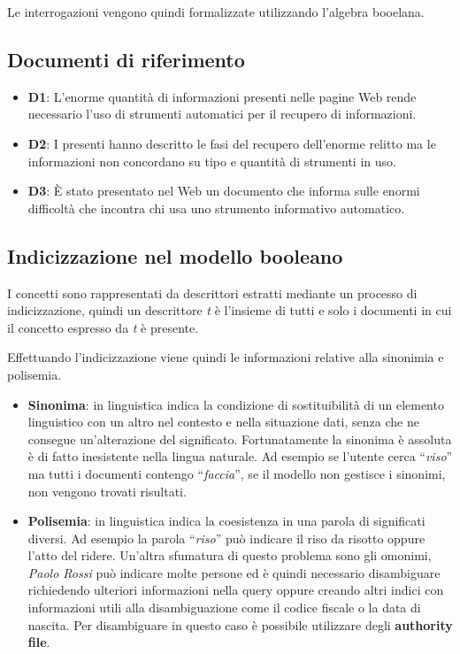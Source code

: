 Le interrogazioni vengono quindi formalizzate utilizzando l'algebra booelana.

\subsection{Documenti di riferimento}

\begin{itemize}
	\item \textbf{D1}: L’enorme quantità di informazioni presenti nelle pagine Web rende necessario l’uso di strumenti automatici per il recupero di informazioni.
	\item \textbf{D2}: I presenti hanno descritto le fasi del recupero dell'enorme relitto ma le informazioni non concordano su tipo e quantità di strumenti in uso.
	\item \textbf{D3}: \`E stato presentato nel Web un documento che informa sulle enormi difficoltà che incontra chi usa uno strumento informativo automatico.
\end{itemize}

\subsection{Indicizzazione nel modello booleano}

I concetti sono rappresentati da descrittori estratti mediante un processo di indicizzazione, quindi un descrittore \textit{t} è l'insieme di tutti e solo i documenti in cui il concetto espresso da \textit{t} è presente.

Effettuando l'indicizzazione viene quindi le informazioni relative alla sinonimia e polisemia.

\begin{itemize}
	\item \textbf{Sinonima}: in linguistica indica la condizione di sostituibilità di un elemento linguistico con un altro nel contesto e nella situazione dati, senza che ne consegue un'alterazione del significato. Fortunatamente la sinonima è assoluta è di fatto inesistente nella lingua naturale. Ad esempio se l'utente cerca ``\textit{viso}'' ma tutti i documenti contengo ``\textit{faccia}'', se il modello non gestisce i sinonimi, non vengono trovati risultati.
	\item \textbf{Polisemia}: in linguistica indica la coesistenza in una parola di significati diversi. Ad esempio la parola ``\textit{riso}'' può indicare il riso da risotto oppure l'atto del ridere. Un'altra sfumatura di questo problema sono gli omonimi, \textit{Paolo Rossi} può indicare molte persone ed è quindi necessario disambiguare richiedendo ulteriori informazioni nella query oppure creando altri indici con informazioni utili alla disambiguazione come il codice fiscale o la data di nascita. Per disambiguare in questo caso è possibile utilizzare degli \textbf{authority file}.
\end{itemize}

